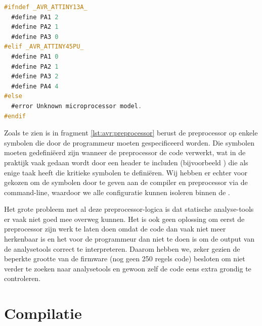\begin{lstlisting}[language=C, float, caption=Omzetten van AVR symbolen via preprocessor-logica., label=lst:avr:preprocessor]
#ifndef _AVR_ATTINY13A_
  #define PA1 2
  #define PA2 1
  #define PA3 0
#elif _AVR_ATTINY45PU_
  #define PA1 0
  #define PA2 1
  #define PA3 2
  #define PA4 4
#else
  #error Unknown microprocessor model.
#endif
\end{lstlisting}

Zoals te zien is in fragment \ref{lst:avr:preprocessor} berust de preprocessor op enkele symbolen die door de programmeur moeten gespecificeerd worden. Die symbolen moeten gedefiniëerd zijn wanneer de preprocessor de code verwerkt, wat in de praktijk vaak gedaan wordt door een header te includen (bijvoorbeeld ) die als enige taak heeft die kritieke symbolen te definiëren. Wij hebben er echter voor gekozen om de symbolen door te geven aan de compiler en preprocessor via de command-line, waardoor we alle configuratie kunnen isoleren binnen de .

Het grote probleem met al deze preprocessor-logica is dat statische analyse-tools er vaak niet goed mee overweg kunnen. Het is ook geen oplossing om eerst de preprocessor zijn werk te laten doen omdat de code dan vaak niet meer herkenbaar is en het voor de programmeur dan niet te doen is om de output van de analysetools correct te interpreteren. Daarom hebben we, zeker gezien de beperkte grootte van de firmware (nog geen 250 regels code) besloten om niet verder te zoeken naar analysetools en gewoon zelf de code eens extra grondig te controleren.

\section{Compilatie}

